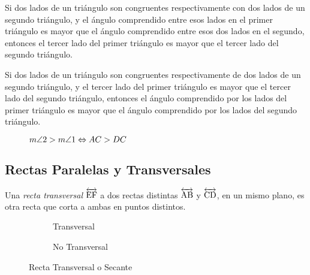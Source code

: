 \clearpage

\begin{theorem}
    Si dos lados de un triángulo son congruentes respectivamente con dos lados de un segundo triángulo, y el ángulo comprendido entre esos lados en el primer triángulo es mayor que el ángulo comprendido entre esos dos lados en el segundo, entonces el tercer lado del primer triángulo es mayor que el tercer lado del segundo triángulo.
\end{theorem}

\begin{theorem}
    Si dos lados de un triángulo son congruentes respectivamente de dos lados de un segundo triángulo, y el tercer lado del primer triángulo es mayor que el tercer lado del segundo triángulo, entonces el ángulo comprendido por los lados del primer triángulo es mayor que el ángulo comprendido por los lados del segundo triángulo.

    \begin{figure}[!h]
        \centering
        
        \caption{$m\angle{2} > m\angle{1} \Leftrightarrow AC > DC$}
        \label{fig:theorem5}
    \end{figure}
    
\end{theorem}

\subsection{Rectas Paralelas y Transversales}

\begin{definition}
    Una \textit{recta transversal} $\overleftrightarrow{\rm EF}$ a dos rectas distintas $\overleftrightarrow{\rm AB}$ y $\overleftrightarrow{\rm CD}$, en un mismo plano, es otra recta que corta a ambas en puntos distintos.


    \begin{figure}[h!]

        \centering

        \begin{subfigure}[b]{.5\textwidth}
            \centering
            
            \label{fig:transversal}
            \caption{Transversal}
        \end{subfigure}%
        \begin{subfigure}[b]{.5\textwidth}
            \centering
            
            \label{fig:not-transversal}
            \caption{No Transversal}
        \end{subfigure}

        \centering
        \caption{Recta Transversal o Secante}
        \label{fig:transversal-line}
        
    \end{figure}        
    
\end{definition}


